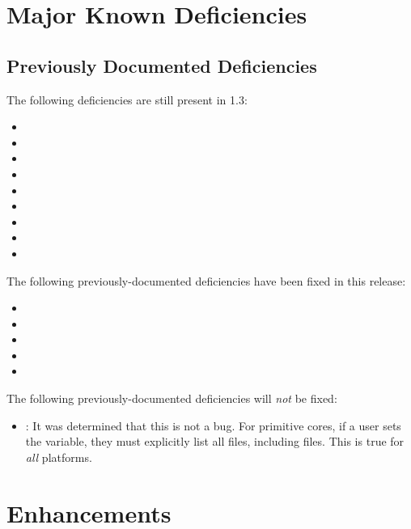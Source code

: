\section{Major Known Deficiencies}
\label{sec:13_bugs}

\subsection{Previously Documented Deficiencies}
The following deficiencies are still present in 1.3:
\begin{itemize}
\setlength\itemsep{0em} %
\item {}
\item {}
\item {}
\item {}
\item {}
\item {}
\item {}
\item {}
\item {}
\end{itemize}

The following previously-documented deficiencies have been fixed in this release:
\begin{itemize}
\setlength\itemsep{0em} %
\item {}
\item {}
\item {}
\item {}
\item {}
\end{itemize}

The following previously-documented deficiencies will \textit{not} be fixed:
\begin{itemize}
\setlength\itemsep{0em} %
\item {}: It was determined that this is not a bug. For primitive cores, if a user sets the  variable, they must explicitly list all files, including  files. This is true for \textit{all} platforms.
\end{itemize}


\newpage
{}
\def\ocpiversion{v1.2.0}  %
\section{Enhancements}
